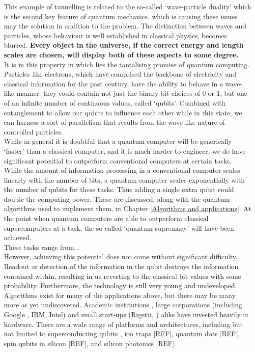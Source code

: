 This example of tunnelling is related to the so-called `wave-particle duality' which is the second key feature of quantum mechanics. which is causing these issues may the solution in addition to the problem. The distinction between waves and particles, whose behaviour is well established in classical physics, becomes blurred. \textbf{Every object in the universe, if the correct energy and length scales are chosen, will display both of these aspects to some degree.} \\

It is in this property in which lies the tantalising promise of quantum computing. Particles like electrons, which have comprised the backbone of electricity and classical information for the past century, have the ability to behave in a wave-like manner: they could contain not just the binary bit choices of 0 or 1,  but one of an infinite number of continuous values, called `qubits'. Combined with entanglement to allow our qubits to influence each other while in this state, we can harness a sort of parallelism that results from the wave-like nature of controlled particles.  \\


While in general it is doubtful that a quantum computer will be generically  `faster' than a classical computer, and it is much harder to engineer, we do have significant potential to outperform conventional computers at certain tasks. While the amount of information processing in a conventional computer scales linearly with the number of bits, a quantum computer scales exponentially with the number of qubits for these tasks. Thus adding a single extra qubit could double the computing power. These are discussed, along with the quantum algorithms used to implement them, in Chapter \ref{Algorithms and applications}. At the point when quantum computers are able to outperform classical supercomputers at a task, the so-called `quantum supremacy' will have been achieved. \\

These tasks range from... \\ 

 

However, achieving this potential does not come without significant difficulty. Readout or detection of the information in the qubit destroys the information contained within, resulting in us reverting to the classical bit values with some probability. Furthermore, the technology is still very young and undeveloped. Algorithms exist for many of the applications above, but there may be many more as yet undiscovered. Academic institutions , large corporations (including Google \cite{bristlecone}, IBM, Intel) and small start-ups (Rigetti, \cite{rigettihome}) alike have invested heavily in hardware. There are a wide range of platforms and architectures, including but not limited to superconducting qubits \cite{bristlecone}, ion traps [REF], quantum dots [REF], spin qubits in silicon [REF], and silicon photonics [REF]. \\


